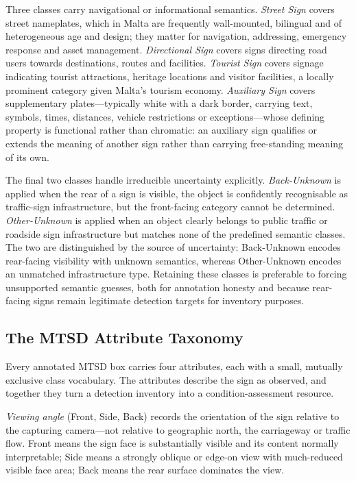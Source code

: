 Three classes carry navigational or informational semantics. \emph{Street Sign} covers street nameplates, which in Malta are frequently wall-mounted, bilingual and of heterogeneous age and design; they matter for navigation, addressing, emergency response and asset management. \emph{Directional Sign} covers signs directing road users towards destinations, routes and facilities. \emph{Tourist Sign} covers signage indicating tourist attractions, heritage locations and visitor facilities, a locally prominent category given Malta's tourism economy. \emph{Auxiliary Sign} covers supplementary plates---typically white with a dark border, carrying text, symbols, times, distances, vehicle restrictions or exceptions---whose defining property is functional rather than chromatic: an auxiliary sign qualifies or extends the meaning of another sign rather than carrying free-standing meaning of its own.

The final two classes handle irreducible uncertainty explicitly. \emph{Back-Unknown} is applied when the rear of a sign is visible, the object is confidently recognisable as traffic-sign infrastructure, but the front-facing category cannot be determined. \emph{Other-Unknown} is applied when an object clearly belongs to public traffic or roadside sign infrastructure but matches none of the predefined semantic classes. The two are distinguished by the source of uncertainty: Back-Unknown encodes rear-facing visibility with unknown semantics, whereas Other-Unknown encodes an unmatched infrastructure type. Retaining these classes is preferable to forcing unsupported semantic guesses, both for annotation honesty and because rear-facing signs remain legitimate detection targets for inventory purposes.

\subsection{The MTSD Attribute Taxonomy}
\label{sec:bg-attributes}

Every annotated MTSD box carries four attributes, each with a small, mutually exclusive class vocabulary. The attributes describe the sign as observed, and together they turn a detection inventory into a condition-assessment resource.

\emph{Viewing angle} (Front, Side, Back) records the orientation of the sign relative to the capturing camera---not relative to geographic north, the carriageway or traffic flow. Front means the sign face is substantially visible and its content normally interpretable; Side means a strongly oblique or edge-on view with much-reduced visible face area; Back means the rear surface dominates the view.

